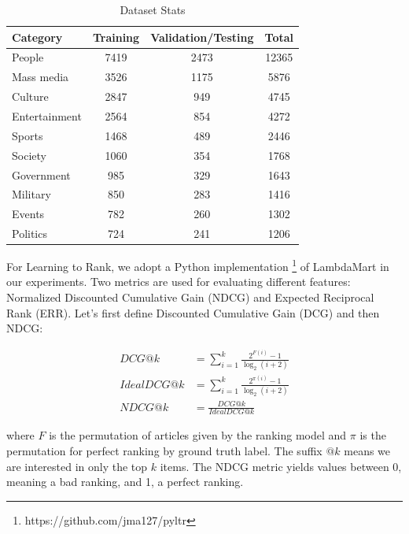 \begin{table}[t]
\centering
\begin{tabular}{lccc}

Category & Training & Validation/Testing & Total \\
\hline \hline
People & 7419 & 2473 & 12365\\

Mass media & 3526 & 1175 & 5876 \\

Culture & 2847 & 949 & 4745 \\

Entertainment & 2564 & 854 & 4272 \\

Sports & 1468 & 489 & 2446 \\

Society & 1060 & 354 & 1768 \\

Government & 985 & 329 & 1643 \\

Military & 850 & 283 & 1416 \\

Events & 782 & 260 & 1302 \\

Politics & 724 & 241 & 1206 \\


\end{tabular}
\caption{Dataset Stats}
\label{table_partition}
\end{table}

For Learning to Rank, we adopt a Python implementation \footnote{https://github.com/jma127/pyltr} of LambdaMart \cite{wu2010adapting} in our experiments. Two metrics are used for evaluating different features: Normalized Discounted Cumulative Gain (NDCG) and Expected Reciprocal Rank (ERR). Let's first define Discounted Cumulative Gain (DCG) and then NDCG:

\begin{align*}
DCG@k & = \sum_{i=1}^{k} \frac{2^{F(i)} - 1}{\log_{2} (i+2)} \\
IdealDCG@k & = \sum_{i=1}^{k} \frac{2^{\pi(i)} - 1}{\log_{2} (i+2)} \\
NDCG@k & = \frac{DCG@k} {IdealDCG@k}
\end{align*}

where $F$ is the permutation of articles given by the ranking model and $\pi$ is the permutation for perfect ranking by ground truth label. The suffix $@k$ means we are interested in only the top $k$ items. The NDCG metric yields values between 0, meaning a bad ranking, and 1, a perfect ranking.

